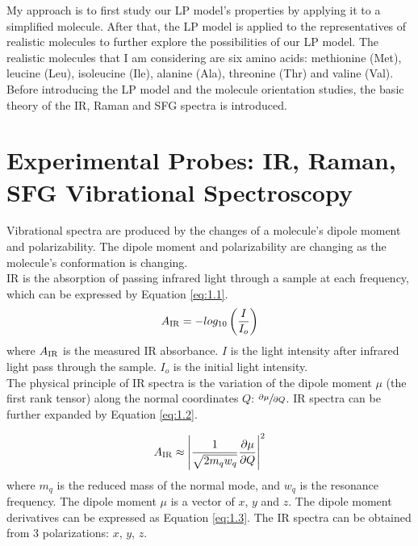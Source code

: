 My approach is to first study our LP model's properties by applying it to a simplified molecule. After that, the LP model is applied to the representatives of realistic molecules to further explore the possibilities of our LP model. The realistic molecules that I am considering are six amino acids: methionine (Met), leucine (Leu), isoleucine (Ile), alanine (Ala), threonine (Thr) and valine (Val).\\

Before introducing the LP model and the molecule orientation studies, the basic theory of  the IR, Raman and SFG spectra is introduced.\\

\section{Experimental Probes: IR, Raman, SFG Vibrational Spectroscopy}
Vibrational spectra are produced by the changes of a molecule's dipole moment and polarizability. The dipole moment and polarizability are changing as the molecule's conformation is changing. \\

IR is the absorption of passing infrared light through a sample at each frequency, which can be expressed by Equation \ref{eq:1.1}. \\

\begin{equation} \label{eq:1.1}
A_{\rm IR} = - log_{10} \left( \frac{I}{I_{o}} \right)
\end{equation}
where $A_{\rm IR}$ is the measured IR absorbance. $I$ is the light intensity after infrared light pass through the sample. $I_{o}$ is the initial light intensity. \\

The physical principle of IR spectra is the variation of the dipole moment $\mu$ (the first rank tensor) along the normal coordinates $Q$: $\sfrac{\partial\mu}{\partial Q}$. IR spectra can be further expanded by Equation \ref{eq:1.2}.

\begin{equation} \label{eq:1.2}
A_{\rm IR} \approx \left| \frac{1}{\sqrt{2m_{q}w_{q}}} \frac{\partial\mu}{\partial Q} \right|^{2}
\end{equation}
where $m_{q}$ is the reduced mass of the normal mode, and $w_{q}$ is the resonance frequency. The dipole moment $\mu$ is a vector of $x$, $y$ and $z$. The dipole moment derivatives can be expressed as Equation \ref{eq:1.3}. The IR spectra can be obtained from 3 polarizations: $x$, $y$, $z$. \\

